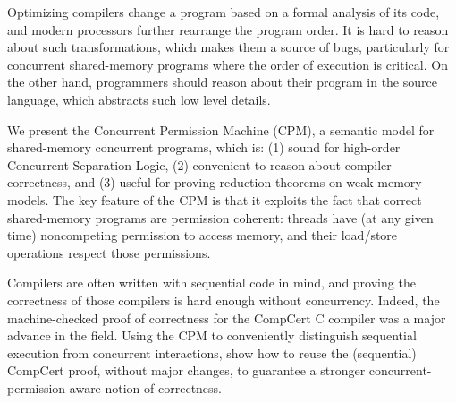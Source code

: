 Optimizing compilers change a program based on a formal analysis of its code, and
modern processors further rearrange the program order. It is hard to reason about such 
transformations, which makes them a source of bugs, particularly for concurrent 
shared-memory programs where the order of execution is critical. On the other hand, 
programmers should reason about their program in the source language, which abstracts 
such low level details. 

We present the Concurrent Permission Machine (CPM), a semantic model for
shared-memory concurrent programs, which is: (1) sound for high-order Concurrent 
Separation Logic, (2) convenient to reason about compiler correctness, and (3) useful 
for proving reduction theorems on weak memory models. The key feature of the CPM
is that it exploits the fact that correct shared-memory programs are permission coherent: 
threads have (at any given time) noncompeting permission to access memory, and their
load/store operations respect those permissions.

Compilers are often written with sequential code in mind, and proving the correctness of
those compilers is hard enough without concurrency. Indeed, the machine-checked 
proof of correctness for the CompCert C compiler was a major advance in the field. 
Using the CPM to conveniently distinguish sequential execution from concurrent 
interactions,  show how to reuse the (sequential) CompCert proof, without major changes, 
to guarantee a stronger concurrent-permission-aware notion of correctness.